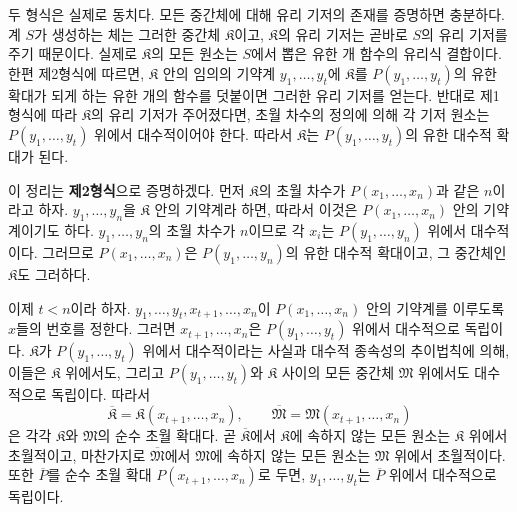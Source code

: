 두 형식은 실제로 동치다. 모든 중간체에 대해 유리 기저의 존재를 증명하면 충분하다. 계 $S$가 생성하는 체는 그러한 중간체 $\mathfrak K$이고, $\mathfrak K$의 유리 기저는 곧바로 $S$의 유리 기저를 주기 때문이다. 실제로 $\mathfrak K$의 모든 원소는 $S$에서 뽑은 유한 개 함수의 유리식 결합이다. 한편 제2형식에 따르면, $\mathfrak K$ 안의 임의의 기약계 $y_1,\ldots,y_t$에 $\mathfrak K$를 $P(y_1,\ldots,y_t)$의 유한 확대가 되게 하는 유한 개의 함수를 덧붙이면 그러한 유리 기저를 얻는다. 반대로 제1형식에 따라 $\mathfrak K$의 유리 기저가 주어졌다면, 초월 차수의 정의에 의해 각 기저 원소는 $P(y_1,\ldots,y_t)$ 위에서 대수적이어야 한다. 따라서 $\mathfrak K$는 $P(y_1,\ldots,y_t)$의 유한 대수적 확대가 된다.

이 정리는 \textbf{제2형식}으로 증명하겠다. 먼저 $\mathfrak K$의 초월 차수가 $P(x_1,\ldots,x_n)$과 같은 $n$이라고 하자. $y_1,\ldots,y_n$을 $\mathfrak K$ 안의 기약계라 하면, 따라서 이것은 $P(x_1,\ldots,x_n)$ 안의 기약계이기도 하다. $y_1,\ldots,y_n$의 초월 차수가 $n$이므로 각 $x_i$는 $P(y_1,\ldots,y_n)$ 위에서 대수적이다. 그러므로 $P(x_1,\ldots,x_n)$은 $P(y_1,\ldots,y_n)$의 유한 대수적 확대이고, 그 중간체인 $\mathfrak K$도 그러하다.

이제 $t<n$이라 하자. $y_1,\ldots,y_t,x_{t+1},\ldots,x_n$이 $P(x_1,\ldots,x_n)$ 안의 기약계를 이루도록 $x$들의 번호를 정한다. 그러면 $x_{t+1},\ldots,x_n$은 $P(y_1,\ldots,y_t)$ 위에서 대수적으로 독립이다. $\mathfrak K$가 $P(y_1,\ldots,y_t)$ 위에서 대수적이라는 사실과 대수적 종속성의 추이법칙에 의해, 이들은 $\mathfrak K$ 위에서도, 그리고 $P(y_1,\ldots,y_t)$와 $\mathfrak K$ 사이의 모든 중간체 $\mathfrak M$ 위에서도 대수적으로 독립이다. 따라서
\[
\overline{\mathfrak K}=\mathfrak K(x_{t+1},\ldots,x_n),
\qquad
\overline{\mathfrak M}=\mathfrak M(x_{t+1},\ldots,x_n)
\]
은 각각 $\mathfrak K$와 $\mathfrak M$의 순수 초월 확대다. 곧 $\overline{\mathfrak K}$에서 $\mathfrak K$에 속하지 않는 모든 원소는 $\mathfrak K$ 위에서 초월적이고, 마찬가지로 $\overline{\mathfrak M}$에서 $\mathfrak M$에 속하지 않는 모든 원소는 $\mathfrak M$ 위에서 초월적이다. 또한 $\overline P$를 순수 초월 확대 $P(x_{t+1},\ldots,x_n)$로 두면, $y_1,\ldots,y_t$는 $\overline P$ 위에서 대수적으로 독립이다.

